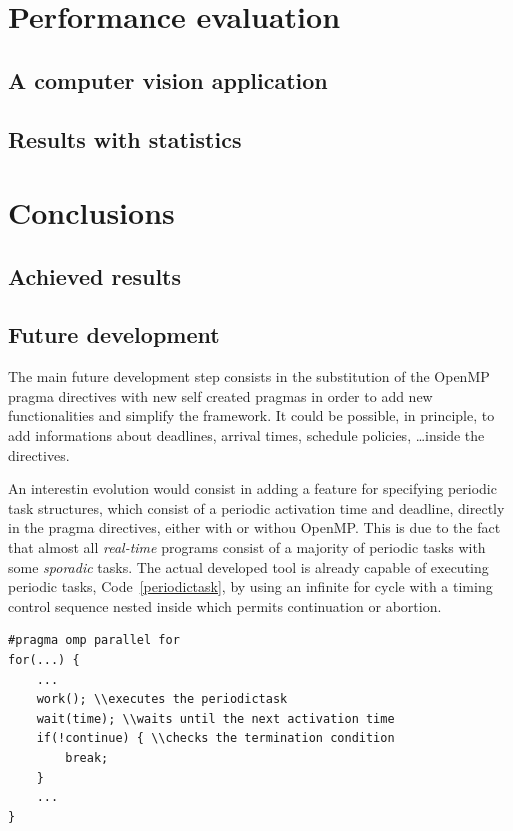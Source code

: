\documentclass[a4paper,11pt,oneside]{book}
\begin{document}
\chapter{Performance evaluation}
\section{A computer vision application}
\section{Results with statistics}

\chapter{Conclusions}
\section{Achieved results}
\section{Future development}

The main future development step consists in the substitution of the OpenMP pragma directives with new self created pragmas in order to add new functionalities and simplify the framework. It could be possible, in principle, to add informations about deadlines, arrival times, schedule policies, \dots inside the directives. 

An interestin evolution would consist in adding a feature for specifying periodic task structures, which consist of a periodic activation time and deadline, directly in the pragma directives, either with or withou OpenMP. This is due to the fact that almost all \emph{real-time} programs consist of a majority of periodic tasks with some \emph{sporadic} tasks. The actual developed tool is already capable of executing periodic tasks, Code~\ref{periodictask}, by using an infinite for cycle with a timing control sequence nested inside which permits continuation or abortion.

\begin{lstlisting}[language=CCC, caption=Example of a periodic task., label=periodictask]
#pragma omp parallel for
for(...) {
	...
	work(); \\executes the periodictask
	wait(time); \\waits until the next activation time
	if(!continue) { \\checks the termination condition
		break;
	}
	...
}

\end{lstlisting}
\end{document}

